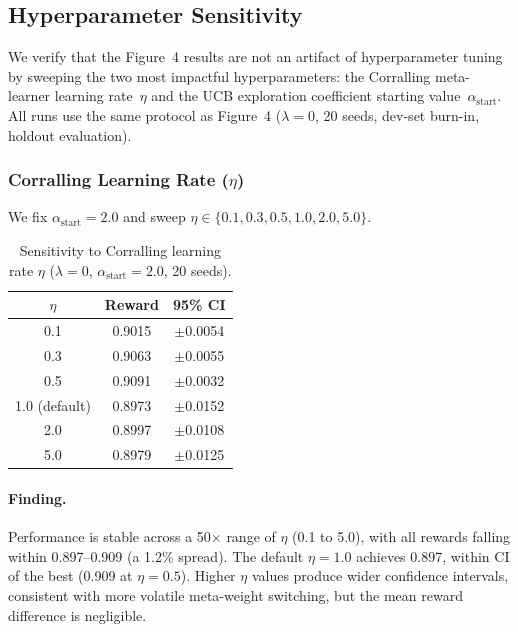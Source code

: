 
\subsection{Hyperparameter Sensitivity}
\label{appendix:hp_sensitivity}

We verify that the Figure~4 results are not an artifact of hyperparameter
tuning by sweeping the two most impactful hyperparameters: the Corralling
meta-learner learning rate~$\eta$ and the UCB exploration coefficient
starting value~$\alpha_{\text{start}}$.  All runs use the same protocol as
Figure~4 ($\lambda{=}0$, 20 seeds, dev-set burn-in, holdout evaluation).

\subsubsection{Corralling Learning Rate ($\eta$)}

We fix $\alpha_{\text{start}}{=}2.0$ and sweep
$\eta \in \{0.1, 0.3, 0.5, 1.0, 2.0, 5.0\}$.

\begin{table}[h]
\centering
\caption{Sensitivity to Corralling learning rate $\eta$ ($\lambda{=}0$,
$\alpha_{\text{start}}{=}2.0$, 20 seeds).}
\label{tab:eta_sensitivity}
\small
\begin{tabular}{@{}ccc@{}}
\toprule
$\eta$ & \textbf{Reward} & \textbf{95\% CI} \\
\midrule
0.1 & 0.9015 & $\pm$0.0054 \\
0.3 & 0.9063 & $\pm$0.0055 \\
0.5 & 0.9091 & $\pm$0.0032 \\
1.0 (default) & 0.8973 & $\pm$0.0152 \\
2.0 & 0.8997 & $\pm$0.0108 \\
5.0 & 0.8979 & $\pm$0.0125 \\
\bottomrule
\end{tabular}
\end{table}

\paragraph{Finding.}
Performance is stable across a 50$\times$ range of $\eta$ (0.1 to
5.0), with all rewards falling within 0.897--0.909 (a 1.2\% spread).  The
default $\eta{=}1.0$ achieves 0.897, within CI of the best (0.909 at
$\eta{=}0.5$).  Higher $\eta$ values produce wider confidence intervals,
consistent with more volatile meta-weight switching, but the mean reward
difference is negligible.

